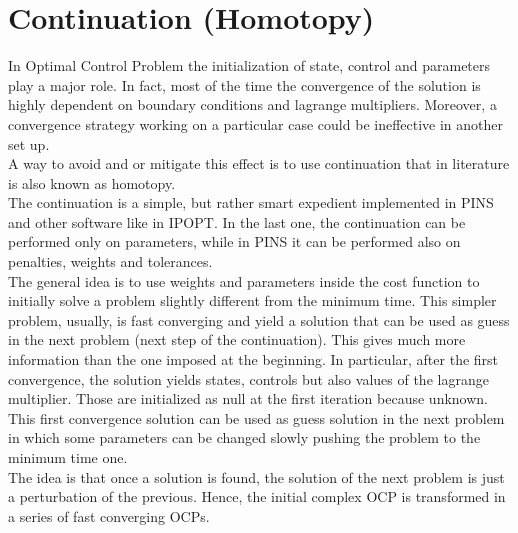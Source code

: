 \section{Continuation (Homotopy)} 
\label{sec:Continuation}   
%
In Optimal Control Problem the initialization of state, control and parameters play a major role. In fact, most of the time the convergence of the solution is highly dependent on boundary conditions and lagrange multipliers. Moreover, a convergence strategy working on a particular case could be ineffective in another set up.\\
A way to avoid and or mitigate this effect is to use continuation that in literature is also known as homotopy.\cite{effati2011solving}\\
The continuation is a simple, but rather smart expedient implemented in PINS and other software like in IPOPT. In the last one, the continuation can be performed only on parameters, while in PINS it can be performed also on penalties, weights and tolerances.\\
The general idea is to use weights and parameters inside the cost function to initially solve a problem slightly different from the minimum time. This simpler problem, usually, is fast converging and yield a solution that can be used as guess in the next problem (next step of the continuation). This gives much more information than the one imposed at the beginning. In particular, after the first convergence, the solution yields states, controls but also values of the lagrange multiplier. Those are initialized as null at the first iteration because unknown.\\
This first convergence solution can be used as guess solution in the next problem in which some parameters can be changed slowly pushing the problem to the minimum time one.\\
The idea is that once a solution is found, the solution of the next problem is just a perturbation of the previous. Hence, the initial complex OCP is transformed in a series of fast converging OCPs.\cite{effati2011solving}\\

%